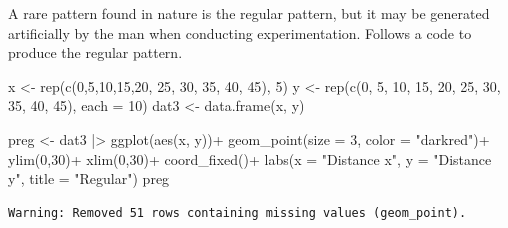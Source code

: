 \documentclass[
  letterpaper,
  DIV=11,
  numbers=noendperiod]{scrreprt}
\newenvironment{Shaded}{\begin{snugshade}}{\end{snugshade}}
\newcommand{\AttributeTok}[1]{\textcolor[rgb]{0.40,0.45,0.13}{#1}}
\newcommand{\DecValTok}[1]{\textcolor[rgb]{0.68,0.00,0.00}{#1}}
\newcommand{\FunctionTok}[1]{\textcolor[rgb]{0.28,0.35,0.67}{#1}}
\newcommand{\NormalTok}[1]{\textcolor[rgb]{0.00,0.23,0.31}{#1}}
\newcommand{\OtherTok}[1]{\textcolor[rgb]{0.00,0.23,0.31}{#1}}
\newcommand{\SpecialCharTok}[1]{\textcolor[rgb]{0.37,0.37,0.37}{#1}}
\newcommand{\StringTok}[1]{\textcolor[rgb]{0.13,0.47,0.30}{#1}}
\begin{document}
A rare pattern found in nature is the regular pattern, but it may be
generated artificially by the man when conducting experimentation.
Follows a code to produce the regular pattern.

\begin{Shaded}
\begin{Highlighting}[]
\NormalTok{x }\OtherTok{\textless{}{-}} \FunctionTok{rep}\NormalTok{(}\FunctionTok{c}\NormalTok{(}\DecValTok{0}\NormalTok{,}\DecValTok{5}\NormalTok{,}\DecValTok{10}\NormalTok{,}\DecValTok{15}\NormalTok{,}\DecValTok{20}\NormalTok{, }\DecValTok{25}\NormalTok{, }\DecValTok{30}\NormalTok{, }\DecValTok{35}\NormalTok{, }\DecValTok{40}\NormalTok{, }\DecValTok{45}\NormalTok{), }\DecValTok{5}\NormalTok{) }
\NormalTok{y }\OtherTok{\textless{}{-}} \FunctionTok{rep}\NormalTok{(}\FunctionTok{c}\NormalTok{(}\DecValTok{0}\NormalTok{, }\DecValTok{5}\NormalTok{, }\DecValTok{10}\NormalTok{, }\DecValTok{15}\NormalTok{, }\DecValTok{20}\NormalTok{, }\DecValTok{25}\NormalTok{, }\DecValTok{30}\NormalTok{, }\DecValTok{35}\NormalTok{, }\DecValTok{40}\NormalTok{, }\DecValTok{45}\NormalTok{), }\AttributeTok{each =} \DecValTok{10}\NormalTok{)}
\NormalTok{dat3 }\OtherTok{\textless{}{-}} \FunctionTok{data.frame}\NormalTok{(x, y)}

\NormalTok{preg }\OtherTok{\textless{}{-}}\NormalTok{ dat3 }\SpecialCharTok{|\textgreater{}}
  \FunctionTok{ggplot}\NormalTok{(}\FunctionTok{aes}\NormalTok{(x, y))}\SpecialCharTok{+}
  \FunctionTok{geom\_point}\NormalTok{(}\AttributeTok{size =} \DecValTok{3}\NormalTok{, }\AttributeTok{color =} \StringTok{"darkred"}\NormalTok{)}\SpecialCharTok{+}
  \FunctionTok{ylim}\NormalTok{(}\DecValTok{0}\NormalTok{,}\DecValTok{30}\NormalTok{)}\SpecialCharTok{+}
  \FunctionTok{xlim}\NormalTok{(}\DecValTok{0}\NormalTok{,}\DecValTok{30}\NormalTok{)}\SpecialCharTok{+}
  \FunctionTok{coord\_fixed}\NormalTok{()}\SpecialCharTok{+}
  \FunctionTok{labs}\NormalTok{(}\AttributeTok{x =} \StringTok{"Distance x"}\NormalTok{, }\AttributeTok{y =} \StringTok{"Distance y"}\NormalTok{, }
       \AttributeTok{title =} \StringTok{"Regular"}\NormalTok{)}
\NormalTok{preg}
\end{Highlighting}
\end{Shaded}

\begin{verbatim}
Warning: Removed 51 rows containing missing values (geom_point).
\end{verbatim}
\end{document}

